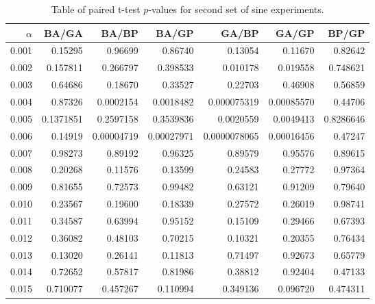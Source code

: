 \documentclass[a4paper,11pt]{article}
\begin{document}
\begin{appendices}
\begin{table}[htb]
\caption{Table of paired t-test $p$-values for second set of sine experiments.} 
\begin{center}
\begin{tabular}{r|rrrrrr}
 $\alpha$  &      BA/GA  &       BA/BP  &       BA/GP  &         GA/BP  &       GA/GP  &      BP/GP  \\
\hline
    0.001  &    0.15295  &     0.96699  &     0.86740  &       0.13054  &     0.11670  &    0.82642  \\
    0.002  &   0.157811  &    0.266797  &    0.398533  &      0.010178  &    0.019558  &   0.748621  \\
    0.003  &    0.64686  &     0.18670  &     0.33527  &       0.22703  &     0.46908  &    0.56859  \\
    0.004  &    0.87326  &   0.0002154  &   0.0018482  &   0.000075319  &  0.00085570  &    0.44706  \\
    0.005  &  0.1371851  &   0.2597158  &   0.3539836  &     0.0020559  &   0.0049413  &  0.8286646  \\
    0.006  &    0.14919  &  0.00004719  &  0.00027971  &  0.0000078065  &  0.00016456  &    0.47247  \\
    0.007  &    0.98273  &     0.89192  &     0.96325  &       0.89579  &     0.95576  &    0.89615  \\
    0.008  &    0.20268  &     0.11576  &     0.13599  &       0.24583  &     0.27772  &    0.97364  \\
    0.009  &    0.81655  &     0.72573  &     0.99482  &       0.63121  &     0.91209  &    0.79640  \\
    0.010  &    0.23567  &     0.19600  &     0.18339  &       0.27572  &     0.26019  &    0.98741  \\
    0.011  &    0.34587  &     0.63994  &     0.95152  &       0.15109  &     0.29466  &    0.67393  \\
    0.012  &    0.36082  &     0.48103  &     0.70215  &       0.10321  &     0.20355  &    0.76434  \\
    0.013  &    0.13020  &     0.26141  &     0.11813  &       0.71497  &     0.92673  &    0.65779  \\
    0.014  &    0.72652  &     0.57817  &     0.81986  &       0.38812  &     0.92404  &    0.47133  \\
    0.015  &   0.710077  &    0.457267  &    0.110994  &      0.349136  &    0.096720  &   0.474311  \\
\end{tabular}
\end{center}
\end{table}



\end{appendices}
\end{document}
